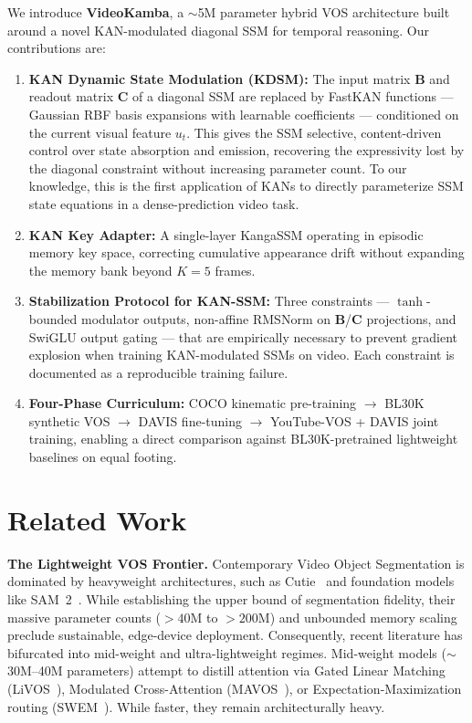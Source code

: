 \documentclass[sigconf]{acmart}
\begin{document}
We introduce \textbf{VideoKamba}, a $\sim$5M parameter hybrid VOS architecture built around a novel KAN-modulated diagonal SSM for temporal reasoning. Our contributions are:
\begin{enumerate}
    \item \textbf{KAN Dynamic State Modulation (KDSM):} The input matrix $\mathbf{B}$ and readout matrix $\mathbf{C}$ of a diagonal SSM are replaced by FastKAN functions — Gaussian RBF basis expansions with learnable coefficients — conditioned on the current visual feature $u_t$. This gives the SSM selective, content-driven control over state absorption and emission, recovering the expressivity lost by the diagonal constraint without increasing parameter count. To our knowledge, this is the first application of KANs to directly parameterize SSM state equations in a dense-prediction video task.
    \item \textbf{KAN Key Adapter:} A single-layer KangaSSM operating in episodic memory key space, correcting cumulative appearance drift without expanding the memory bank beyond $K=5$ frames.
    \item \textbf{Stabilization Protocol for KAN-SSM:} Three constraints — $\tanh$-bounded modulator outputs, non-affine RMSNorm on $\mathbf{B}$/$\mathbf{C}$ projections, and SwiGLU output gating — that are empirically necessary to prevent gradient explosion when training KAN-modulated SSMs on video. Each constraint is documented as a reproducible training failure.
    \item \textbf{Four-Phase Curriculum:} COCO kinematic pre-training $\to$ BL30K synthetic VOS $\to$ DAVIS fine-tuning $\to$ YouTube-VOS + DAVIS joint training, enabling a direct comparison against BL30K-pretrained lightweight baselines on equal footing.
\end{enumerate}

\section{Related Work}
\label{sec:related}

\textbf{The Lightweight VOS Frontier.} 
Contemporary Video Object Segmentation is dominated by heavyweight architectures, such as Cutie~\cite{cheng2024cutie} and foundation models like SAM~2~\cite{ravi2024sam2}. While establishing the upper bound of segmentation fidelity, their massive parameter counts ($>40$M to $>200$M) and unbounded memory scaling preclude sustainable, edge-device deployment. Consequently, recent literature has bifurcated into mid-weight and ultra-lightweight regimes. Mid-weight models ($\sim$30M--40M parameters) attempt to distill attention via Gated Linear Matching (LiVOS~\cite{liu2025livos}), Modulated Cross-Attention (MAVOS~\cite{Shaker_2025_WACV}), or Expectation-Maximization routing (SWEM~\cite{lin2022swem}). While faster, they remain architecturally heavy. 
\end{document}
